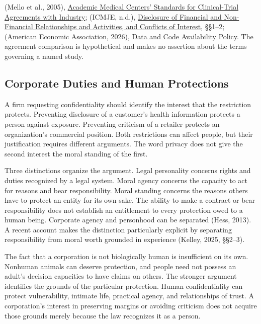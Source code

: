 \noindent (Mello et al., 2005),
\href{https://doi.org/10.1056/NEJMsa044115}{Academic Medical Centers'
Standards for Clinical-Trial Agreements with Industry}; (ICMJE, n.d.),
\href{https://www.icmje.org/recommendations/browse/roles-and-responsibilities/author-responsibilities--conflicts-of-interest.html}{Disclosure
of Financial and Non-Financial Relationships and Activities, and
Conflicts of Interest}, §§1--2; (American Economic Association, 2026),
\href{https://www.aeaweb.org/journals/data/data-code-policy}{Data and
Code Availability Policy}. The agreement comparison is hypothetical and
makes no assertion about the terms governing a named study.

\hypertarget{M09-corporate-duties-and-human-protections}{%
\subsection{Corporate Duties and Human
Protections}\label{M09-corporate-duties-and-human-protections}}

\noindent \noindent A firm requesting confidentiality should identify the interest
that the restriction protects. Preventing disclosure of a customer's
health information protects a person against exposure. Preventing
criticism of a retailer protects an organization's commercial position.
Both restrictions can affect people, but their justification requires
different arguments. The word privacy does not give the second interest
the moral standing of the first.

Three distinctions organize the argument. Legal personality concerns
rights and duties recognized by a legal system. Moral agency concerns
the capacity to act for reasons and bear responsibility. Moral standing
concerns the reasons others have to protect an entity for its own sake.
The ability to make a contract or bear responsibility does not establish
an entitlement to every protection owed to a human being. Corporate
agency and personhood can be separated (Hess, 2013). A recent account
makes the distinction particularly explicit by separating responsibility
from moral worth grounded in experience (Kelley, 2025, §§2--3).

The fact that a corporation is not biologically human is insufficient on
its own. Nonhuman animals can deserve protection, and people need not
possess an adult's decision capacities to have claims on others. The
stronger argument identifies the grounds of the particular protection.
Human confidentiality can protect vulnerability, intimate life,
practical agency, and relationships of trust. A corporation's interest
in preserving margins or avoiding criticism does not acquire those
grounds merely because the law recognizes it as a person.

